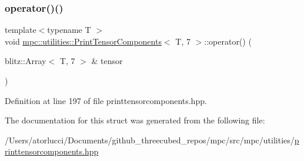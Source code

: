 \subsubsection{\texorpdfstring{operator()()}{operator()()}}
{\footnotesize\ttfamily template$<$typename T $>$ \\
void \mbox{\hyperlink{structmpc_1_1utilities_1_1_print_tensor_components}{mpc\+::utilities\+::\+Print\+Tensor\+Components}}$<$ T, 7 $>$\+::operator() (\begin{DoxyParamCaption}\item[{blitz\+::\+Array$<$ T, 7 $>$ \&}]{tensor }\end{DoxyParamCaption})\hspace{0.3cm}{\ttfamily [inline]}}



Definition at line 197 of file printtensorcomponents.\+hpp.



The documentation for this struct was generated from the following file\+:\begin{DoxyCompactItemize}
\item 
/\+Users/atorlucci/\+Documents/github\+\_\+threecubed\+\_\+repos/mpc/src/mpc/utilities/\mbox{\hyperlink{printtensorcomponents_8hpp}{printtensorcomponents.\+hpp}}\end{DoxyCompactItemize}
